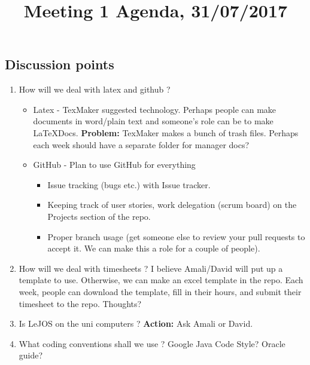 \documentclass[a4paper]{article}
\title{Meeting 1 Agenda, 31/07/2017}
\date{}
\begin{document}
\maketitle

\begin{flushleft}

\section{Discussion points}
\begin{enumerate}
	\item How will we deal with latex and github ? 
	\begin{itemize}
		\item Latex - TexMaker suggested technology. Perhaps people can make documents in word/plain text and someone's role can be to make \LaTeX Docs. \textbf{Problem:} TexMaker makes a bunch of trash files. Perhaps each week should have a separate folder for manager docs?
		\item GitHub - Plan to use GitHub for everything
		\begin{itemize}
			\item Issue tracking (bugs etc.) with Issue tracker.
			\item Keeping track of user stories, work delegation (scrum board) on the Projects section of the repo.
			\item Proper branch usage (get someone else to review your pull requests to accept it. We can make this a role for a couple of people).
		\end{itemize}
	\end{itemize}
	
    \item How will we deal with timesheets ?
    \linebreak
    I believe Amali/David will put up a template to use. Otherwise, we can make an excel template in the repo.
    Each week, people can download the template, fill in their hours, and submit their timesheet to the repo. Thoughts?
    
    \item Is LeJOS on the uni computers ? 
    \linebreak
    \textbf{Action:} Ask Amali or David.
    
    \item What coding conventions shall we use ? 
    \linebreak
    Google Java Code Style? Oracle guide?
    

\end{enumerate}
\end{flushleft}
\end{document}

